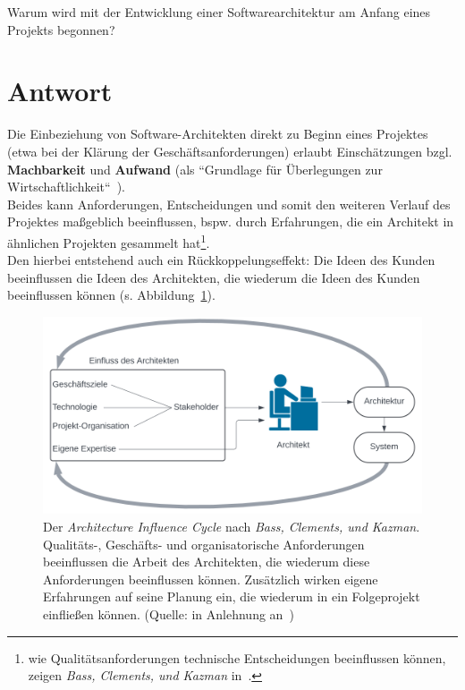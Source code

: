 Warum wird mit der Entwicklung einer Softwarearchitektur am Anfang eines Projekts begonnen?

\section*{Antwort}
Die Einbeziehung von Software-Architekten direkt zu Beginn eines Projektes (etwa bei der Klärung der Geschäftsanforderungen) erlaubt Einschätzungen bzgl. \textbf{Machbarkeit} und \textbf{Aufwand} (als ``Grundlage für Überlegungen zur Wirtschaftlichkeit``~\cite[37]{Wed09b}).\\
Beides kann Anforderungen, Entscheidungen und somit den weiteren Verlauf des Projektes maßgeblich beeinflussen, {bspw.} durch Erfahrungen, die ein Architekt in ähnlichen Projekten gesammelt hat\footnote{
    wie Qualitätsanforderungen technische Entscheidungen beeinflussen können, zeigen \textit{Bass, Clements, und Kazman} in~\cite[41]{BCK12}.
}.\\
Den hierbei entstehend auch ein Rückkoppelungseffekt: Die Ideen des Kunden beeinflussen die Ideen des Architekten, die wiederum die Ideen des Kunden beeinflussen können (s. Abbildung~\ref{fig:aic}).\\


\begin{figure}
    \centering
    \includegraphics[scale=0.4]{chapters/aufgabe 6/img/aic}
    \caption{Der \textit{Architecture Influence Cycle} nach \textit{Bass, Clements, und Kazman}. Qualitäts-, Geschäfts- und organisatorische Anforderungen beeinflussen die Arbeit des Architekten, die wiederum diese Anforderungen beeinflussen können. Zusätzlich wirken eigene Erfahrungen auf seine Planung ein, die wiederum in ein Folgeprojekt einfließen können.  (Quelle: in Anlehnung an~\cite[58, Figure 3.5]{BCK12})}
    \label{fig:aic}
\end{figure}